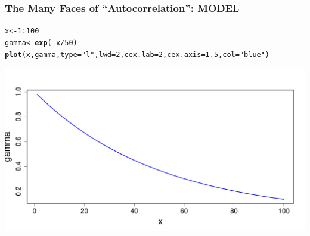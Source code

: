 \documentclass[mathserif,compress]{beamer}\usepackage{graphicx, color}
\makeatletter
\newcommand{\hlfunctioncall}[1]{\textcolor[rgb]{0.501960784313725,0,0.329411764705882}{\textbf{#1}}}%
\newcommand{\hlstring}[1]{\textcolor[rgb]{0.6,0.6,1}{#1}}%
\newenvironment{kframe}{%
 \def\at@end@of@kframe{}%
 \ifinner\ifhmode%
  \def\at@end@of@kframe{\end{minipage}}%
  \begin{minipage}{\columnwidth}%
 \fi\fi%
 \def\FrameCommand##1{\hskip\@totalleftmargin \hskip-\fboxsep
 \colorbox{shadecolor}{##1}\hskip-\fboxsep
     \hskip-\linewidth \hskip-\@totalleftmargin \hskip\columnwidth}%
 \MakeFramed {\advance\hsize-\width
   \@totalleftmargin\z@ \linewidth\hsize
   \@setminipage}}%
 {\par\unskip\endMakeFramed%
 \at@end@of@kframe}
\newenvironment{knitrout}{}{} %
\makeatother
\begin{document}
\begin{frame} [fragile]
\frametitle{The Many Faces of ``Autocorrelation'': MODEL}
     
\begin{knitrout}\tiny
{}\color{fgcolor}\begin{kframe}
\begin{alltt}
x <- 1:100
gamma <- \hlfunctioncall{exp}(-x/50)
\hlfunctioncall{plot}(x, gamma, type = \hlstring{"l"}, lwd = 2, cex.lab = 2, cex.axis = 1.5, col = \hlstring{"blue"})
\end{alltt}
\end{kframe}

{\centering \includegraphics[width=.7\linewidth]{figure/AutoCor-ModelFig} 

}



\end{knitrout}

\end{frame}
\end{document}
